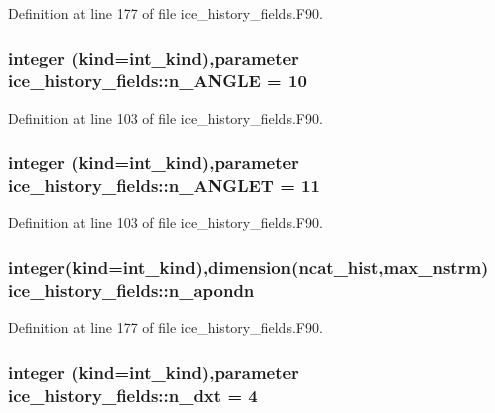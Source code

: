 Definition at line 177 of file ice\_\-history\_\-fields.F90.\hypertarget{namespaceice__history__fields_a130bc8773e91330b2369823f37e4c9c3}{
\subsubsection[{n\_\-ANGLE}]{\setlength{\rightskip}{0pt plus 5cm}integer (kind=int\_\-kind),parameter {\bf ice\_\-history\_\-fields::n\_\-ANGLE} = 10}}
\label{namespaceice__history__fields_a130bc8773e91330b2369823f37e4c9c3}


Definition at line 103 of file ice\_\-history\_\-fields.F90.\hypertarget{namespaceice__history__fields_a253f0d4683bb614814edffa539758e3f}{
\subsubsection[{n\_\-ANGLET}]{\setlength{\rightskip}{0pt plus 5cm}integer (kind=int\_\-kind),parameter {\bf ice\_\-history\_\-fields::n\_\-ANGLET} = 11}}
\label{namespaceice__history__fields_a253f0d4683bb614814edffa539758e3f}


Definition at line 103 of file ice\_\-history\_\-fields.F90.\hypertarget{namespaceice__history__fields_a4d3b9e888569b2534dbceeaf3292b696}{
\subsubsection[{n\_\-apondn}]{\setlength{\rightskip}{0pt plus 5cm}integer(kind=int\_\-kind),dimension({\bf ncat\_\-hist},max\_\-nstrm) {\bf ice\_\-history\_\-fields::n\_\-apondn}}}
\label{namespaceice__history__fields_a4d3b9e888569b2534dbceeaf3292b696}


Definition at line 177 of file ice\_\-history\_\-fields.F90.\hypertarget{namespaceice__history__fields_a613db804c0915e1be10166a897ae5620}{
\subsubsection[{n\_\-dxt}]{\setlength{\rightskip}{0pt plus 5cm}integer (kind=int\_\-kind),parameter {\bf ice\_\-history\_\-fields::n\_\-dxt} = 4}}
\label{namespaceice__history__fields_a613db804c0915e1be10166a897ae5620}


